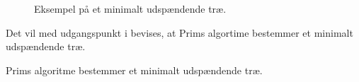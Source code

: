 \begin{figure}[!h]
  \centering
  
  \caption{Eksempel på et minimalt udspændende træ.}
  \label{eks_prim}
\end{figure}

Det vil med udgangspunkt i \citep{prim} bevises, at Prims algortime bestemmer et minimalt udspændende træ.

\begin{thm}
Prims algoritme bestemmer et minimalt udspændende træ. 
\label{set_prim}
\end{thm}






